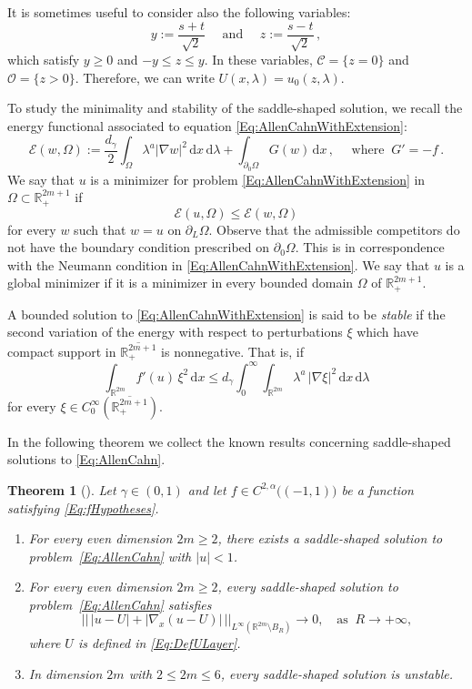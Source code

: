 \documentclass[12pt,reqno]{amsart}
\newtheorem{theorem}{Theorem}[section]
\theoremstyle{definition}
\theoremstyle{remark}
\newcommand{\con}[1]{\mathbb{#1}}
\newcommand{\R}{\con{R}} %
\newcommand{\ccal}{\mathscr{C}}
\newcommand{\ecal}{\mathcal{E}}
\newcommand{\ocal}{\mathcal{O}}
\newcommand{\s}{\gamma}
\renewcommand{\d}{\,\mathrm{d}} %
\numberwithin{equation}{section}
\begin{document}
It is sometimes useful to consider also the following variables:
$$
y := \dfrac{s+t}{\sqrt{2}} \quad \text{ and } \quad z := \dfrac{s-t}{\sqrt{2}} \,,
$$
which satisfy $y\geq 0$ and $-y \leq z \leq y$. In these variables, $\ccal = \{ z = 0\}$ and $\ocal = \{ z > 0\}$. Therefore, we can write $U(x,\lambda) = u_0(z, \lambda)$.




 
To study the minimality and stability of the saddle-shaped solution, we recall the energy functional associated to equation \eqref{Eq:AllenCahnWithExtension}:
$$
\ecal (w, \Omega) := \dfrac{d_\s}{2}\int_{\Omega} \lambda^a | \nabla w |^2 \d x \d \lambda + \int_{\partial_0 \Omega} G(w)\d x\,, \quad \text{ where }\ G' = -f\,.
$$
We say that $u$ is a minimizer for problem \eqref{Eq:AllenCahnWithExtension} in  $\Omega \subset \R^{2m+1}_+$ if
$$
\ecal(u,\Omega) \leq \ecal(w,\Omega)
$$
for every $w$ such that $w=u$ on $\partial_L \Omega$. Observe that the admissible competitors do not have the boundary condition prescribed on $\partial_0\Omega$. This is in correspondence with the Neumann condition in \eqref{Eq:AllenCahnWithExtension}. We say that $u$ is a global minimizer if it is a minimizer in every bounded domain $\Omega$ of $\R^{2m+1}_+$.

A bounded solution to \eqref{Eq:AllenCahnWithExtension} is said to be \emph{stable} if the second variation of the energy with respect to perturbations $\xi$ which have compact support in $\overline{\R^{2m+1}_+}$ is nonnegative. That is, if
\begin{equation}
\label{Eq:StabilityCondition}
\int_{\R^{2m}} f'(u) \, \xi^2 \d x  \leq d_\s \int_0^\infty \int_{\R^{2m}} \lambda^a \, |\nabla \xi|^2 \d x \d \lambda 
\end{equation}
for every $\xi \in C^\infty_0(\overline{\R^{2m+1}_+})$.

In the following theorem we collect the known results concerning saddle-shaped solutions to \eqref{Eq:AllenCahn}. 

\begin{theorem}[\cite{Cinti-Saddle,Cinti-Saddle2,CabreSolaMorales,CabreSireII}]
\label{Th:Summary}
Let $\s \in (0,1)$  and let $f\in C^{2,\alpha}\big((-1,1)\big)$ be a function satisfying \eqref{Eq:fHypotheses}.
\begin{enumerate}[label=(\roman{*})]
\item For every even dimension $2m\geq 2$, there exists a saddle-shaped solution to  problem~\eqref{Eq:AllenCahn} with $|u|<1$.
\item For every even dimension $2m\geq 2$, every saddle-shaped solution to problem~\eqref{Eq:AllenCahn} satisfies
$$ \big|\big| \, |u-U| + |\nabla_x(u-U)| \, \big|\big|_{L^\infty(\R^{2m}\setminus B_R)} \to 0, \ \ \ \text{ as } \ R\to+\infty, $$
where $U$ is defined in \eqref{Eq:DefULayer}.
\item In  dimension $2m$ with $2\leq 2m \leq 6$, every saddle-shaped solution is unstable.
\end{enumerate}
\end{theorem}
\end{document}
